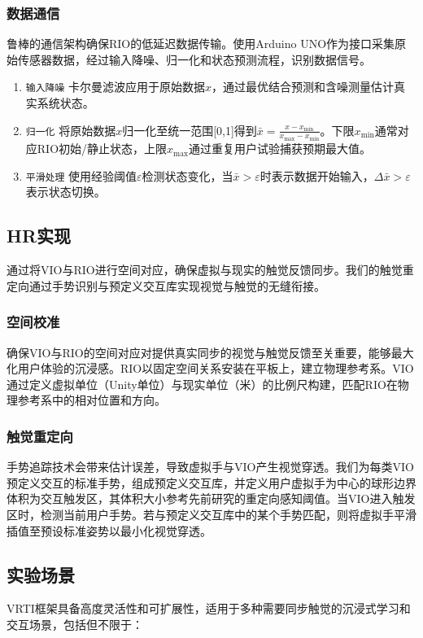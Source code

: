 \documentclass[runningheads]{llncs}
\begin{document}
\subsubsection{数据通信}
鲁棒的通信架构确保RIO的低延迟数据传输。使用Arduino UNO作为接口采集原始传感器数据，经过输入降噪、归一化和状态预测流程，识别数据信号。
\begin{enumerate}[label={\arabic*)}]
  \item \texttt{输入降噪} 卡尔曼滤波应用于原始数据$x$，通过最优结合预测和含噪测量估计真实系统状态。
  \item \texttt{归一化} 将原始数据$x$归一化至统一范围[0,1]得到$\bar{x}=\displaystyle\frac{x-x_{\min}}{x_{\max}-x_{\min}}$。下限$x_{\min}$通常对应RIO初始/静止状态，上限$x_{\max}$通过重复用户试验捕获预期最大值。
  \item \texttt{平滑处理} 使用经验阈值$\varepsilon$检测状态变化，当$\bar{x}>\varepsilon$时表示数据开始输入，$\Delta\bar{x}>\varepsilon$表示状态切换。
\end{enumerate}

\subsection{HR实现}
通过将VIO与RIO进行空间对应，确保虚拟与现实的触觉反馈同步。我们的触觉重定向通过手势识别与预定义交互库实现视觉与触觉的无缝衔接。

\subsubsection{空间校准}
确保VIO与RIO的空间对应对提供真实同步的视觉与触觉反馈至关重要，能够最大化用户体验的沉浸感。RIO以固定空间关系安装在平板上，建立物理参考系。VIO通过定义虚拟单位（Unity单位）与现实单位（米）的比例尺构建，匹配RIO在物理参考系中的相对位置和方向。

\subsubsection{触觉重定向}
手势追踪技术会带来估计误差，导致虚拟手与VIO产生视觉穿透。我们为每类VIO预定义交互的标准手势，组成预定义交互库，并定义用户虚拟手为中心的球形边界体积为交互触发区，其体积大小参考先前研究的重定向感知阈值。当VIO进入触发区时，检测当前用户手势。若与预定义交互库中的某个手势匹配，则将虚拟手平滑插值至预设标准姿势以最小化视觉穿透。


\subsection{实验场景}
VRTI框架具备高度灵活性和可扩展性，适用于多种需要同步触觉的沉浸式学习和交互场景，包括但不限于：
\end{document}
